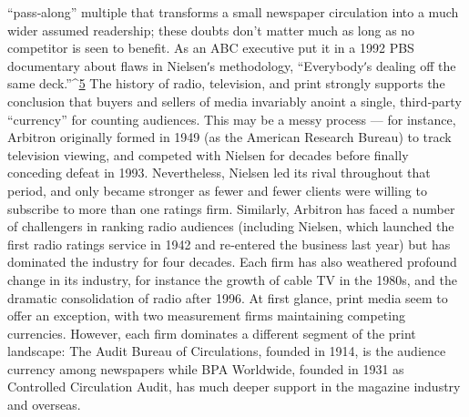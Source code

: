 ``pass‐along'' multiple that transforms a small newspaper circulation into
a much wider assumed readership; these doubts don’t matter much as
long as no competitor is seen to benefit. As an ABC executive put it in a
1992 PBS documentary about flaws in Nielsenʹs methodology,
``Everybodyʹs dealing off the same deck.''^{\href{#endnotes}{5}}
The history of radio, television, and print strongly supports the conclusion
that buyers and sellers of media invariably anoint a single, third‐party
``currency'' for counting audiences. This may be a messy process — for
instance, Arbitron originally formed in 1949 (as the American Research
Bureau) to track television viewing, and competed with Nielsen for
decades before finally conceding defeat in 1993. Nevertheless, Nielsen led
its rival throughout that period, and only became stronger as fewer and
fewer clients were willing to subscribe to more than one ratings firm.
Similarly, Arbitron has faced a number of challengers in ranking radio
audiences (including Nielsen, which launched the first radio ratings
service in 1942 and re‐entered the business last year) but has dominated
the industry for four decades. Each firm has also weathered profound
change in its industry, for instance the growth of cable TV in the 1980s,
and the dramatic consolidation of radio after 1996.
At first glance, print media seem to offer an exception, with two
measurement firms maintaining competing currencies. However, each
firm dominates a different segment of the print landscape: The Audit
Bureau of Circulations, founded in 1914, is the audience currency among
newspapers while BPA Worldwide, founded in 1931 as Controlled
Circulation Audit, has much deeper support in the magazine industry and
overseas.

